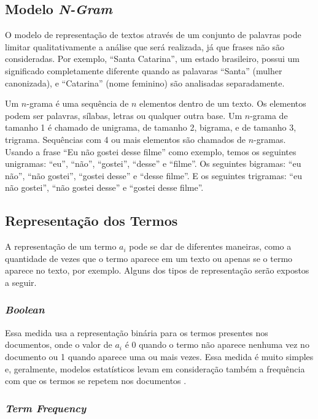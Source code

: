 \subsection{Modelo \textit{N-Gram}}

O modelo de representação de textos através de um conjunto de palavras pode limitar qualitativamente a análise que será realizada, já que frases não são consideradas. Por exemplo, ``Santa Catarina'', um estado brasileiro, possui um significado completamente diferente quando as palavaras ``Santa'' (mulher canonizada), e ``Catarina'' (nome feminino) são analisadas separadamente.

Um \(n\)-grama é uma sequência de \(n\) elementos dentro de um texto. Os elementos podem ser palavras, sílabas, letras ou qualquer outra base. Um \(n\)-grama de tamanho 1 é chamado de unigrama, de tamanho 2, bigrama, e de tamanho 3, trigrama. Sequências com 4 ou mais elementos são chamados de \(n\)-gramas. Usando a frase ``Eu não gostei desse filme'' como exemplo, temos os seguintes unigramas: ``eu'', ``não'', ``gostei'', ``desse'' e ``filme''. Os seguintes bigramas: ``eu não'', ``não gostei'', ``gostei desse'' e ``desse filme''. E os seguintes trigramas: ``eu não gostei'', ``não gostei desse'' e ``gostei desse filme''.

\subsection{Representação dos Termos}
\label{sec:representação_dos_termos}

A representação de um termo \(a_i\) pode se dar de diferentes maneiras, como a quantidade de vezes que o termo aparece em um texto ou apenas se o termo aparece no texto, por exemplo. Alguns dos tipos de representação serão expostos a seguir.

\subsubsection{\textit{Boolean}}
\label{ssub:bag-boolean}

Essa medida usa a representação binária para os termos presentes nos documentos, onde o valor de \(a_{i}\) é 0 quando o termo não aparece nenhuma vez no documento ou 1 quando aparece uma ou mais vezes. Essa medida é muito simples e, geralmente, modelos estatísticos levam em consideração também a frequência com que os termos se repetem nos documentos \cite{buckley1988}.

\subsubsection{\textit{Term Frequency}}
\label{ssub:baf-tf}


